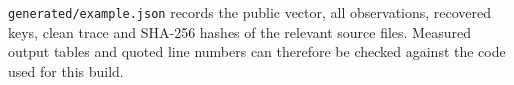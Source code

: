 \documentclass[11pt,a4paper]{report}
\begin{document}
\texttt{generated/example.json} records the public vector, all observations, recovered keys, clean trace and SHA-256 hashes of the relevant source files. Measured output tables and quoted line numbers can therefore be checked against the code used for this build.

\end{document}
